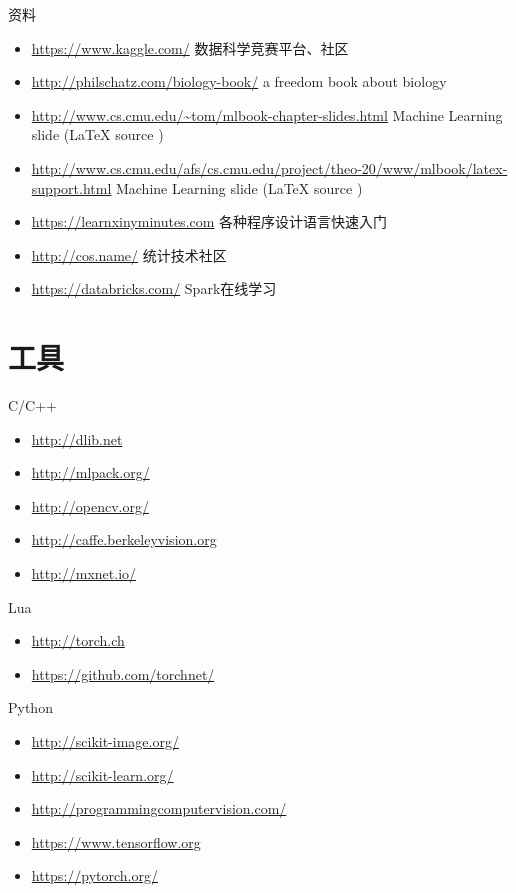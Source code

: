 \documentclass[presentation]{beamer}
\begin{document}
\begin{frame}[label={sec:org6c49f4c}]{资料}
\begin{itemize}
\item \url{https://www.kaggle.com/}
数据科学竞赛平台、社区
\item \url{http://philschatz.com/biology-book/}  
a  freedom book about biology
\item \href{http://www.cs.cmu.edu/\~tom/mlbook-chapter-slides.html}{http://www.cs.cmu.edu/\textasciitilde tom/mlbook-chapter-slides.html}
Machine Learning slide (\LaTeX{} source )
\item \url{http://www.cs.cmu.edu/afs/cs.cmu.edu/project/theo-20/www/mlbook/latex-support.html} 
Machine Learning slide (\LaTeX{} source )
\item \url{https://learnxinyminutes.com}
各种程序设计语言快速入门
\item \url{http://cos.name/}
统计技术社区
\item \url{https://databricks.com/}
Spark在线学习
\end{itemize}
\end{frame}

\section{工具}
\label{sec:org81a800d}
\begin{frame}[label={sec:org40503fa}]{C/C++}
\begin{itemize}
\item \url{http://dlib.net}
\item \url{http://mlpack.org/}
\item \url{http://opencv.org/}
\item \url{http://caffe.berkeleyvision.org}
\item \url{http://mxnet.io/}
\end{itemize}
\end{frame}

\begin{frame}[label={sec:org3bd7f83}]{Lua}
\begin{itemize}
\item \url{http://torch.ch}
\item \url{https://github.com/torchnet/}
\end{itemize}
\end{frame}

\begin{frame}[label={sec:org448ce83}]{Python}
\begin{itemize}
\item \url{http://scikit-image.org/}
\item \url{http://scikit-learn.org/}
\item \url{http://programmingcomputervision.com/}
\item \url{https://www.tensorflow.org}
\item \url{https://pytorch.org/}
\end{itemize}
\end{frame}
\end{document}
